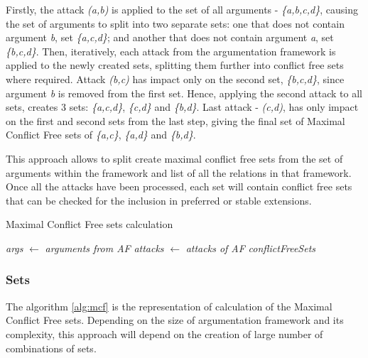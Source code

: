 Firstly, the attack \textit{(a,b)} is applied to the set of all arguments - \textit{\{a,b,c,d\}}, causing the set of arguments to split into two separate sets: one that does not contain argument \textit{b}, set \textit{\{a,c,d\}}; and another that does not contain argument \textit{a}, set \textit{\{b,c,d\}}. Then, iteratively, each attack from the argumentation framework is applied to the newly created sets, splitting them further into conflict free sets where required. Attack \textit{(b,c)} has impact only on the second set, \textit{\{b,c,d\}}, since argument \textit{b} is removed from the first set. Hence, applying the second attack to all sets, creates 3 sets: \textit{\{a,c,d\}}, \textit{\{c,d\}} and \textit{\{b,d\}}. Last attack - \textit{(c,d)}, has only impact on the first and second sets from the last step, giving the final set of Maximal Conflict Free sets of \textit{\{a,c\}}, \textit{\{a,d\}} and \textit{\{b,d\}}.

This approach allows to split create maximal conflict free sets from the set of arguments within the framework and list of all the relations in that framework. Once all the attacks have been processed, each set will contain conflict free sets that can be checked for the inclusion in preferred or stable extensions.

\begin{algorithm}
	\caption{Maximal Conflict Free sets calculation}\label{mcfPseudocode}
	\nl \textit{args} $\gets$ \textit{arguments from AF}\;
	\nl \textit{attacks} $\gets$ \textit{attacks of AF}\;
	\nl \textit{conflictFreeSets} \;
	\nl{}
	{
	}
	\label{alg:mcf}
\end{algorithm}

\subsubsection{Sets}

The algorithm \ref{alg:mcf} is the representation of calculation of the Maximal Conflict Free sets. Depending on the size of argumentation framework and its complexity, this approach will depend on the creation of large number of combinations of sets. 

